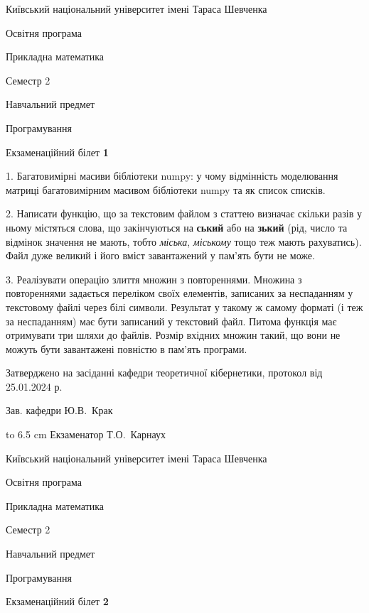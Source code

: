 \documentclass[12pt, ukrainian]{article}
\begin{document}
{{\begin {scriptsize}\par
{ \center  Київський національний університет імені Тараса Шевченка \par}
{\parbox {5 cm}{Освітня програма \hfill}{\parbox {7 cm}{Прикладна математика\hfill}}\parbox {6 cm}{\hfill Семестр 2}}\par
{\parbox {5 cm} {Навчальний предмет \hfill}\parbox {7 cm}{Програмування \hfill}\parbox {6cm}{\hfill}\par}\vspace{-15pt} \end{scriptsize}}{\center Екзаменаційний білет \No \textbf { 1 }\par}}
{%
1. Багатовимірні масиви бібліотеки numpy: у чому відмінність моделювання матриці багатовимірним масивом бібліотеки numpy та як список списків.%
\par
2. Написати функцію, що за текстовим файлом з статтею визначає  скільки разів у ньому містяться слова, що закінчуються на \textbf{ський} або на \textbf{зький} (рід, число та відмінок значення не мають, тобто \textit{міська}, \textit{міському} тощо теж мають рахуватись). Файл дуже великий і його вміст завантажений у пам'ять бути не може.

\par
3. Реалізувати операцію злиття множин з повтореннями. Множина з повтореннями задається переліком своїх елементів, записаних за неспаданням у текстовому файлі через білі символи. Результат у такому ж самому форматі (і теж за неспаданням) має бути записаний у текстовий файл. Питома функція має отримувати три шляхи до файлів. Розмір вхідних множин такий, що вони не можуть бути завантажені повністю в пам’ять програми.

}
{\smallskip\smallskip \begin {scriptsize} Затверджено на засіданні кафедри теоретичної кібернетики, протокол   від   25.01.2024 р.\par\smallskip\smallskip\smallskip\smallskip
{\parbox {6.5 cm} {Зав. кафедри \dotfill Ю.В.~Крак}}\hspace {0.7cm} {\hbox to 6.5 cm { Екзаменатор \dotfill Т.О.~Карнаух}} \end{scriptsize}}
\vspace{0.9cm}
{{\begin {scriptsize}\par
{ \center  Київський національний університет імені Тараса Шевченка \par}
{\parbox {5 cm}{Освітня програма \hfill}{\parbox {7 cm}{Прикладна математика\hfill}}\parbox {6 cm}{\hfill Семестр 2}}\par
{\parbox {5 cm} {Навчальний предмет \hfill}\parbox {7 cm}{Програмування \hfill}\parbox {6cm}{\hfill}\par}\vspace{-15pt} \end{scriptsize}}{\center Екзаменаційний білет \No \textbf { 2 }\par}}
\end{document}
